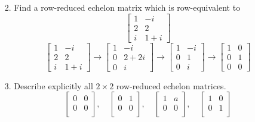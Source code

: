 \documentclass{article}
\begin{document}
\begin{enumerate}[listparindent=\parindent]
\item[2.] Find a row-reduced echelon matrix which is row-equivalent to
    \[
        \begin{bmatrix}
            1 & -i \\
            2 & 2 \\
            i & 1 + i
        \end{bmatrix}
    \]
\[
    \begin{bmatrix}
        1 & -i \\
        2 & 2 \\
        i & 1 + i
    \end{bmatrix}
    \rightarrow
    \begin{bmatrix}
        1 & -i \\
        0 & 2+2i \\
        0 & i
    \end{bmatrix}
    \rightarrow
    \begin{bmatrix}
        1 & -i \\
        0 & 1 \\
        0 & i
    \end{bmatrix}
    \rightarrow
    \boxed{
        \begin{bmatrix}
            1 & 0 \\
            0 & 1 \\
            0 & 0
        \end{bmatrix}
    }
\]

\item[3.] Describe explicitly all \(2 \times 2\) row-reduced echelon matrices.
\[
    \boxed{
        \begin{bmatrix}
            0 & 0 \\
            0 & 0 \\
        \end{bmatrix}
        , \quad
        \begin{bmatrix}
            0 & 1 \\
            0 & 0 \\
        \end{bmatrix}
        , \quad
        \begin{bmatrix}
            1 & a \\
            0 & 0 \\
        \end{bmatrix}
        , \quad
        \begin{bmatrix}
            1 & 0 \\
            0 & 1 \\
        \end{bmatrix}
    }
\]


\end{enumerate}
\end{document}
